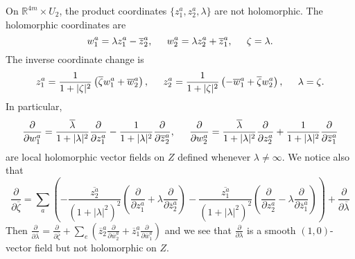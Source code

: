 \documentclass[11pt,oneside,leqno]{amsart}
\theoremstyle{plain}
\theoremstyle{definition}
\begin{document}
On ${{\mathbb R}}^{4m} \times U_2$, the product coordinates $\{z_1^a, z_2^a, \lambda\}$ are not holomorphic.
  The holomorphic coordinates are
  \begin{equation}\label{holomorphic coordinate}
  w_1^a=\lambda z_1^a-\overline{z}^a_2,
  \hspace{.2in}
  w_2^a=\lambda z_2^a+\overline{z}^a_1,
  \hspace{.2in}
  \zeta=\lambda.
  \end{equation}
  The inverse coordinate change is
  \begin{equation}
  z_1^a=\frac{1}{1+|\zeta |^2}\left( {\overline\zeta} w_1^a+\overline{w}^a_2\right),
  \hspace{.2in}
  z_2^a=\frac{1}{1+|\zeta |^2}\left( -\overline{w}^a_1+{\overline\zeta} w_2^a\right),
  \hspace{.2in}
  \lambda=\zeta.
  \end{equation}
  In particular,
  \begin{equation}
  \frac{\partial}{\partial w_1^a}=\frac{\overline{\lambda}}{1+|\lambda|^2}\frac{\partial}{\partial z_1^a} - \frac{1}{1+|\lambda |^2}\frac{\partial}{\partial\overline{z}_2^a},
  \hspace{.2in}
   \frac{\partial}{\partial w_2^a}=\frac{\overline{\lambda}}{1+|\lambda|^2}\frac{\partial}{\partial z_2^a} + \frac{1}{1+|\lambda |^2}\frac{\partial}{\partial\overline{z}_1^a}
  \end{equation}
  are local holomorphic vector fields on $Z$ defined whenever $\lambda\neq\infty$. We notice also that
\begin{equation}
\frac{\partial}{\partial\overline{\zeta}}= \sum_a \left( -\frac{\overline{z_2^a}}{(1+|\lambda|^2)^2}(\frac{\partial}{\partial z_1^a}+\lambda\frac{\partial}{\partial\overline{z}_2^a}) - \frac{\overline{z_1^a}}{(1+|\lambda|^2)^2}(\frac{\partial}{\partial z_2^a}-\lambda\frac{\partial}{\partial\overline{z}_1^a})\right) + \frac{\partial}{\partial\overline{\lambda}}
\end{equation}
Then $\frac{\partial}{\partial\overline{\lambda}} = \frac{\partial}{\partial\overline{\zeta}} + \sum_e\left( \overline{z}_2^a\frac{\partial}{\partial\overline{w}_2^a} + \overline{z}_1^a\frac{\partial}{\partial\overline{w}_1^a}\right)$ and we see that $\frac{\partial}{\partial\lambda}$ is a smooth $(1,0)$-vector field but not holomorphic on $Z$.
\end{document}
